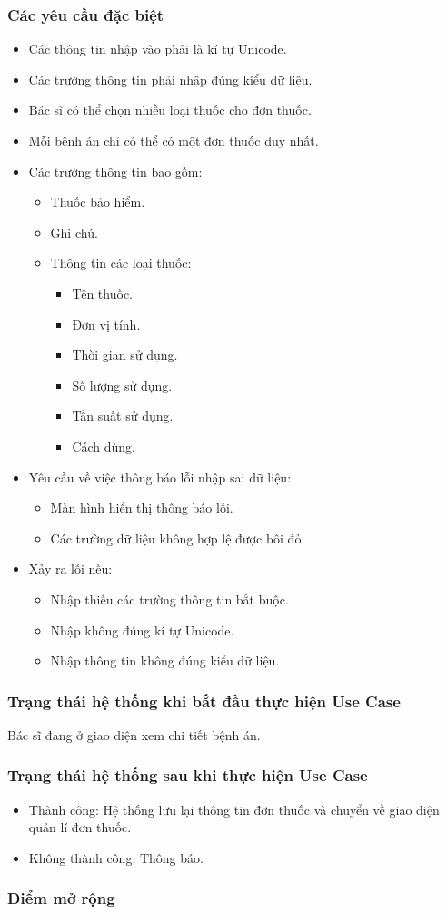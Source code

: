 \subsubsection{Các yêu cầu đặc biệt}
\begin{itemize}
  \item Các thông tin nhập vào phải là kí tự Unicode.
  \item Các trường thông tin phải nhập đúng kiểu dữ liệu.
  \item Bác sĩ có thể chọn nhiều loại thuốc cho đơn thuốc.
  \item Mỗi bệnh án chỉ có thể có một đơn thuốc duy nhất.
  \item Các trường thông tin bao gồm:
  \begin{itemize}
    \item Thuốc bảo hiểm.
    \item Ghi chú.
    \item Thông tin các loại thuốc:
    \begin{itemize}
      \item Tên thuốc.
      \item Đơn vị tính.
      \item Thời gian sử dụng.
      \item Số lượng sử dụng.
      \item Tần suất sử dụng.
      \item Cách dùng.
    \end{itemize}
  \end{itemize}
  \item Yêu cầu về việc thông báo lỗi nhập sai dữ liệu:
  \begin{itemize}
    \item Màn hình hiển thị thông báo lỗi.
    \item Các trường dữ liệu không hợp lệ được bôi đỏ.
  \end{itemize}
  \item Xảy ra lỗi nếu:
  \begin{itemize}
    \item Nhập thiếu các trường thông tin bắt buộc.
    \item Nhập không đúng kí tự Unicode.
    \item Nhập thông tin không đúng kiểu dữ liệu.
  \end{itemize}
\end{itemize}

\subsubsection{Trạng thái hệ thống khi bắt đầu thực hiện Use Case}
Bác sĩ đang ở giao diện xem chi tiết bệnh án.

\subsubsection{Trạng thái hệ thống sau khi thực hiện Use Case}
\begin{itemize}
  \item Thành công: Hệ thống lưu lại thông tin đơn thuốc và chuyển về giao diện quản lí đơn thuốc.
  \item Không thành công: Thông báo.
\end{itemize}

\subsubsection{Điểm mở rộng}